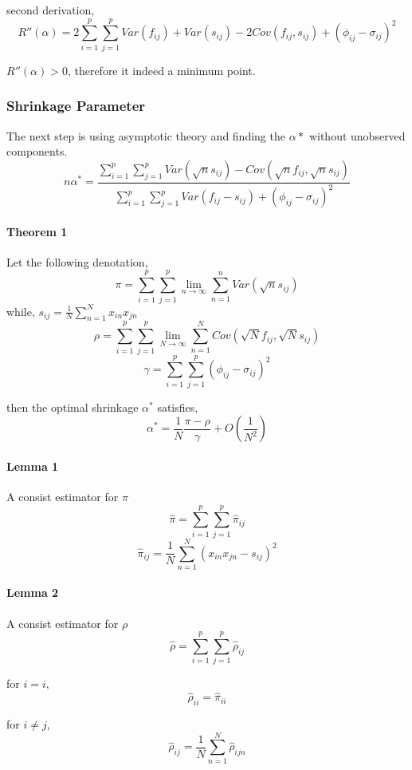 \documentclass[letterpaper]{article}
\begin{document}
	second derivation,
		\[
	R''(\alpha) = 2
	\sum_{i=1}^{p}\sum_{j=1}^{p}
	Var(f_{ij}) + Var(s_{ij}) - 2Cov(f_{ij},s_{ij}) + (\phi_{ij}-\sigma_{ij})^{2}
	\]
	
	\(R''(\alpha) > 0 \), therefore it indeed a minimum point.
	
	
	\subsubsection{Shrinkage Parameter}
	The next step is using asymptotic theory and finding the \(\alpha*\) without unobserved components.\\
	\[
	n\alpha^* = 
	\frac{\sum_{i=1}^{p}\sum_{j=1}^{p}Var(\sqrt{n} s_{ij})-Cov(\sqrt{n}f_{ij},\sqrt{n}s_{ij})}
	{\sum_{i=1}^{p}\sum_{j=1}^{p}Var(f_{ij}-s_{ij}) + (\phi_{ij}-\sigma_{ij})^{2}}
	\]
	
	\paragraph{Theorem 1}
	Let the following denotation, 
	\[\pi =  \sum_{i=1}^{p} \sum_{j=1}^{p} \lim_{n\to\infty} \sum_{n=1}^{n} Var(\sqrt{n}s_{ij}) \]
	while, \(s_{ij} = \frac{1}{N} \sum_{n=1}^{N} x_{in}x_{jn}\)
	\[\rho = \sum_{i=1}^{p} \sum_{j=1}^{p} \lim_{N\to\infty} \sum_{n=1}^{N} Cov(\sqrt{N}f_{ij}, \sqrt{N}s_{ij} )   \]
	\[\gamma =  \sum_{i=1}^{p} \sum_{j=1}^{p} \left( \phi_{ij} -\sigma_{ij}\right)^{2} \]
	
	
	then the optimal shrinkage \(\alpha^{*}\) satisfies, 
	\[\alpha^{*} = \frac{1}{N} \frac{\pi - \rho}{\gamma} + O \left( \frac{1}{N^{2}} \right) \]
	
	\paragraph{Lemma 1} A consist estimator for \(\pi \)
	\[\hat{\pi} = \sum_{i=1}^{p} \sum_{j=1}^{p} \hat{\pi}_{ij} \]
	\[\hat{\pi}_{ij} = \frac{1}{N} \sum_{n=1}^{N} \left( x_{in}x_{jn} - s_{ij} \right)^{2}  \]
	
	\paragraph{Lemma 2} A consist estimator for \(\rho\)
	\[\hat{\rho} = \sum_{i=1}^{p} \sum_{j=1}^{p} \hat{\rho}_{ij} \]
	
	for \(i=i\), 
	\[\hat{\rho}_{ii} = \hat{\pi}_{ii} \]
	
	for \(i \neq j \), 
	\[ \hat{\rho}_{ij} = \frac{1}{N} \sum_{n=1}^{N} \hat{\rho}_{ijn} \]
	
\end{document}
